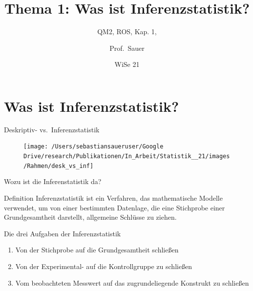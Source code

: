 \documentclass[
  ngerman,
  ignorenonframetext,
]{beamer}
\title{Thema 1: Was ist Inferenzstatistik?}
\subtitle{QM2, ROS, Kap. 1,}
\author{Prof.~Sauer}
\date{WiSe 21}
\institute{AWM, HS Ansbach}
\begin{document}
\frame{\titlepage}

\begin{frame}[allowframebreaks]
  \tableofcontents[hideallsubsections]
\end{frame}
\hypertarget{was-ist-inferenzstatistik}{%
\section{Was ist Inferenzstatistik?}\label{was-ist-inferenzstatistik}}

\begin{frame}{Deskriptiv- vs.~Inferenzstatistik}
\protect\hypertarget{deskriptiv--vs.-inferenzstatistik}{}
\begin{figure}[H]
\texttt{[image: /Users/sebastiansaueruser/Google Drive/research/Publikationen/In\_Arbeit/Statistik\_\_21/images/Rahmen/desk\_vs\_inf]} \end{figure}
\end{frame}

\begin{frame}{Wozu ist die Inferenstatistik da?}
\protect\hypertarget{wozu-ist-die-inferenstatistik-da}{}
\begin{alertblock}{Definition}
Inferenzstatistik ist ein Verfahren, das mathematische Modelle verwendet, um von einer bestimmten Datenlage, die eine Stichprobe einer Grundgesamtheit darstellt, allgemeine Schlüsse zu ziehen.
\end{alertblock}
\end{frame}

\begin{frame}{Die drei Aufgaben der Inferenzstatistik}
\protect\hypertarget{die-drei-aufgaben-der-inferenzstatistik}{}
\begin{enumerate}
\item
  Von der Stichprobe auf die Grundgesamtheit schließen
\item
  Von der Experimental- auf die Kontrollgruppe zu schließen
\item
  Vom beobachteten Messwert auf das zugrundeliegende Konstrukt zu
  schließen
\end{enumerate}
\end{frame}
\end{document}
